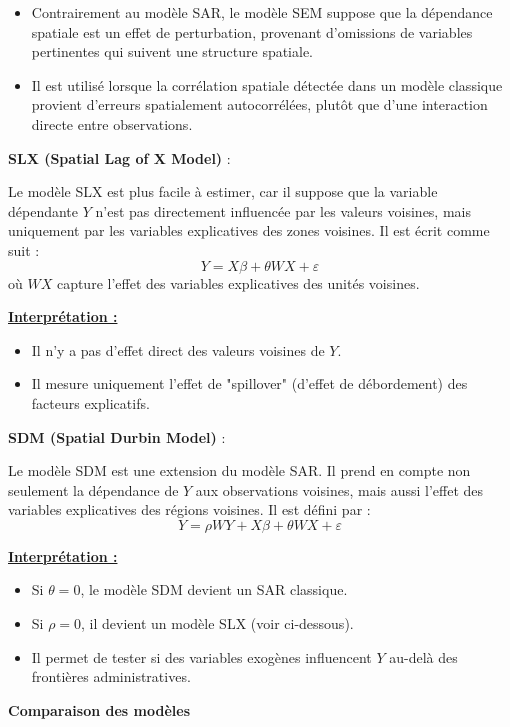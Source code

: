 \documentclass[
]{article}
\begin{document}
\begin{itemize}
\item Contrairement au modèle SAR, le modèle SEM suppose que la dépendance spatiale est un effet de perturbation, provenant d’omissions de variables pertinentes qui suivent une structure spatiale.
\item Il est utilisé lorsque la corrélation spatiale détectée dans un modèle classique provient d’erreurs spatialement autocorrélées, plutôt que d’une interaction directe entre observations.
\end{itemize}

\textbf{SLX (Spatial Lag of X Model)} :

Le modèle SLX est plus facile à estimer, car il suppose que la variable
dépendante \(Y\) n'est pas directement influencée par les valeurs
voisines, mais uniquement par les variables explicatives des zones
voisines. Il est écrit comme suit : \[
Y = X \beta + \theta W X + \varepsilon
\] où \(W X\) capture l'effet des variables explicatives des unités
voisines.

\underline{\textbf{Interprétation :}}

\begin{itemize}
\item Il n’y a pas d’effet direct des valeurs voisines de \( Y \).
\item Il mesure uniquement l'effet de "spillover" (d'effet de débordement) des facteurs explicatifs.
\end{itemize}

\textbf{SDM (Spatial Durbin Model)} :

Le modèle SDM est une extension du modèle SAR. Il prend en compte non
seulement la dépendance de \(Y\) aux observations voisines, mais aussi
l'effet des variables explicatives des régions voisines. Il est défini
par : \[
Y = \rho W Y + X \beta + \theta W X + \varepsilon
\]

\underline{\textbf{Interprétation :}}

\begin{itemize}
\item Si \( \theta = 0 \), le modèle SDM devient un SAR classique.
\item Si \( \rho = 0 \), il devient un modèle SLX (voir ci-dessous).
\item Il permet de tester si des variables exogènes influencent \( Y \) au-delà des frontières administratives.
\end{itemize}

\textbf{Comparaison des modèles}
\end{document}
